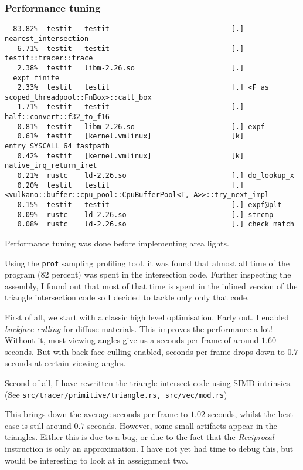 \documentclass{article}
\begin{document}
\subsubsection{Performance tuning}
\begin{verbatim}
  83.82%  testit   testit                             [.] nearest_intersection
   6.71%  testit   testit                             [.] testit::tracer::trace
   2.38%  testit   libm-2.26.so                       [.] __expf_finite
   2.33%  testit   testit                             [.] <F as scoped_threadpool::FnBox>::call_box
   1.71%  testit   testit                             [.] half::convert::f32_to_f16
   0.81%  testit   libm-2.26.so                       [.] expf
   0.61%  testit   [kernel.vmlinux]                   [k] entry_SYSCALL_64_fastpath
   0.42%  testit   [kernel.vmlinux]                   [k] native_irq_return_iret
   0.21%  rustc    ld-2.26.so                         [.] do_lookup_x
   0.20%  testit   testit                             [.] <vulkano::buffer::cpu_pool::CpuBufferPool<T, A>>::try_next_impl
   0.15%  testit   testit                             [.] expf@plt
   0.09%  rustc    ld-2.26.so                         [.] strcmp
   0.08%  rustc    ld-2.26.so                         [.] check_match
\end{verbatim}
Performance tuning was done before implementing area lights.

Using the \texttt{prof} sampling profiling tool, it was found that almost all time of the
program (82 percent) was spent in the intersection code, Further inspecting the assembly,
I found out that most of that time is spent in the inlined version of the triangle intersection code
so I decided to tackle only only that code.

First of all, we start with a classic high level optimisation. Early out. I
enabled \emph{backface culling} for diffuse materials. This improves the
performance a lot!  Without it, most viewing angles give us a seconds per frame
of around $1.60$ seconds.  But with back-face culling enabled, seconds per
frame drops down to $0.7$ seconds at certain viewing angles.

Second of all, I have rewritten the triangle intersect code using SIMD
intrinsics. (See \texttt{src/tracer/primitive/triangle.rs, src/vec/mod.rs})

This brings down the average seconds per frame to $1.02$ seconds, whilst the
best case is still around $0.7$ seconds.  However, some small artifacts appear
in the triangles. Either this is due to a bug, or due to the fact that the
\emph{Reciprocal} instruction is only an approximation. I have not yet had time
to debug this, but would be interesting to look at in asssignment two.
\end{document}
